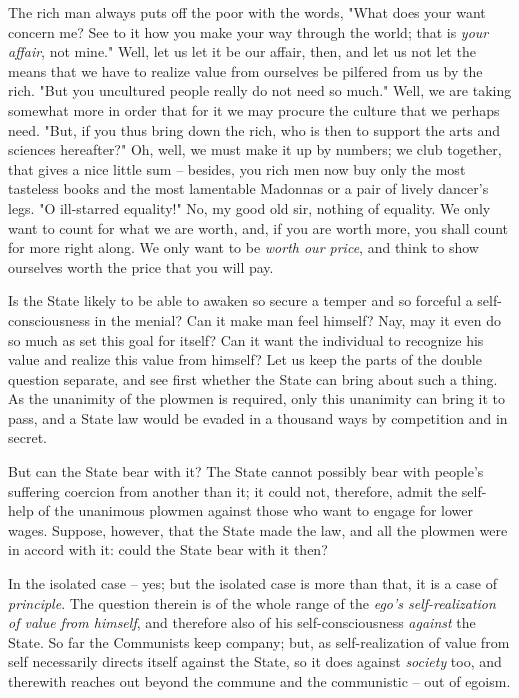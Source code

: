 The rich man always puts off the poor with the words, "{}What does your want 
concern me? See to it how you make your way through the world; that is 
\textit{your affair}, not mine."{} Well, let us let it be our affair, then, 
and let us not let the means that we have to realize value from ourselves be 
pilfered from us by the rich. "{}But you uncultured people really do not need 
so much."{} Well, we are taking somewhat more in order that for it we may 
procure the culture that we perhaps need. "{}But, if you thus bring down the 
rich, who is then to support the arts and sciences hereafter?"{} Oh, well, we 
must make it up by numbers; we club together, that gives a nice little sum -- 
besides, you rich men now buy only the most tasteless books and the most 
lamentable Madonnas or a pair of lively dancer's legs. "{}O ill-starred 
equality!"{} No, my good old sir, nothing of equality. We only want to count 
for what we are worth, and, if you are worth more, you shall count for more 
right along. We only want to be \textit{worth our price}, and think to show 
ourselves worth the price that you will pay.

Is the State likely to be able to awaken so secure a temper and so forceful a 
self-consciousness in the menial? Can it make man feel himself? Nay, may it 
even do so much as set this goal for itself? Can it want the individual to 
recognize his value and realize this value from himself? Let us keep the parts 
of the double question separate, and see first whether the State can bring 
about such a thing. As the unanimity of the plowmen is required, only this 
unanimity can bring it to pass, and a State law would be evaded in a thousand 
ways by competition and in secret.

But can the State bear with it? The State cannot possibly bear with people's 
suffering coercion from another than it; it could not, therefore, admit the 
self-help of the unanimous plowmen against those who want to engage for lower 
wages. Suppose, however, that the State made the law, and all the plowmen were 
in accord with it: could the State bear with it then?

In the isolated case -- yes; but the isolated case is more than that, it is a 
case of \textit{principle}. The question therein is of the whole range of the 
\textit{ego's self-realization of value from himself}, and therefore also of 
his self-consciousness \textit{against} the State. So far the Communists keep 
company; but, as self-realization of value from self necessarily directs 
itself against the State, so it does against \textit{society} too, and 
therewith reaches out beyond the commune and the communistic -- out of egoism.

